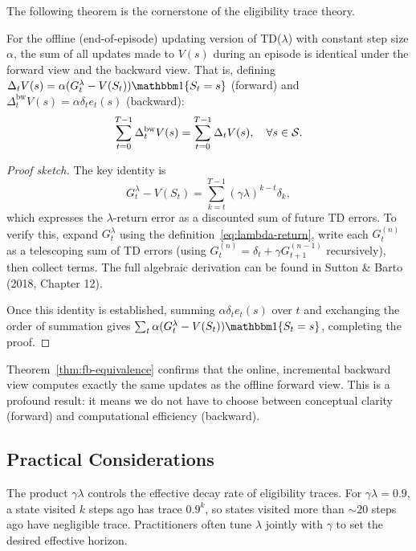 The following theorem is the cornerstone of the eligibility trace theory.

\begin{theorem}
\label{thm:fb-equivalence}
For the offline (end-of-episode) updating version of TD($\lambda$) with constant step size $\alpha$, the sum of all updates made to $V(s)$ during an episode is identical under the forward view and the backward view.  That is, defining $\Delta_t V(s) = \alpha(G_t^\lambda - V(S_t))\ind\{S_t=s\}$ (forward) and $\Delta_t^{\mathrm{bw}}V(s) = \alpha\delta_t e_t(s)$ (backward):
\begin{equation}
\label{eq:fb-equiv}
\sum_{t=0}^{T-1}\Delta_t^{\mathrm{bw}}V(s) = \sum_{t=0}^{T-1}\Delta_t V(s), \quad \forall s\in\mathcal{S}.
\end{equation}
\end{theorem}

\begin{proof}[Proof sketch]
The key identity is
\[
G_t^\lambda - V(S_t) = \sum_{k=t}^{T-1}(\gamma\lambda)^{k-t}\delta_k,
\]
which expresses the $\lambda$-return error as a discounted sum of future TD errors.  To verify this, expand $G_t^\lambda$ using the definition~\eqref{eq:lambda-return}, write each $G_t^{(n)}$ as a telescoping sum of TD errors (using $G_t^{(n)} = \delta_t + \gamma G_{t+1}^{(n-1)}$ recursively), then collect terms.  The full algebraic derivation can be found in Sutton \& Barto (2018, Chapter 12).

Once this identity is established, summing $\alpha\delta_t e_t(s)$ over $t$ and exchanging the order of summation gives $\sum_t \alpha(G_t^\lambda-V(S_t))\ind\{S_t=s\}$, completing the proof.
\end{proof}

Theorem~\ref{thm:fb-equivalence} confirms that the online, incremental backward view computes exactly the same updates as the offline forward view.  This is a profound result: it means we do not have to choose between conceptual clarity (forward) and computational efficiency (backward).

\subsection{Practical Considerations}

\begin{remark}
The product $\gamma\lambda$ controls the effective decay rate of eligibility traces.  For $\gamma\lambda = 0.9$, a state visited $k$ steps ago has trace $0.9^k$, so states visited more than $\sim 20$ steps ago have negligible trace.  Practitioners often tune $\lambda$ jointly with $\gamma$ to set the desired effective horizon.
\end{remark}

